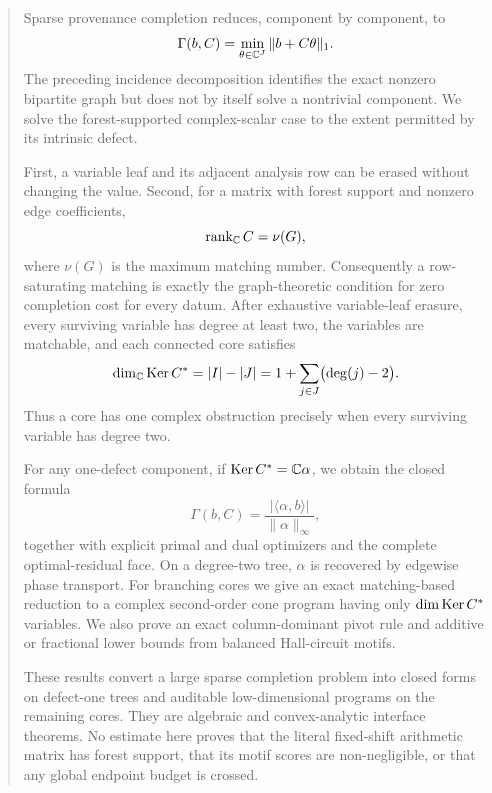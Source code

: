 \begin{abstract}
Sparse provenance completion reduces, component by component, to
\[
  \Gamma(b,C)=\min_{\theta\in\C^J}\|b+C\theta\|_1.
\]
The preceding incidence decomposition identifies the exact nonzero
bipartite graph but does not by itself solve a nontrivial component.  We
solve the forest-supported complex-scalar case to the extent permitted
by its intrinsic defect.

First, a variable leaf and its adjacent analysis row can be erased
without changing the value.  Second, for a matrix with forest support
and nonzero edge coefficients,
\[
  \rank_{\C} C=\nu(G),
\]
where \(\nu(G)\) is the maximum matching number.  Consequently a
row-saturating matching is exactly the graph-theoretic condition for
zero completion cost for every datum.  After exhaustive variable-leaf
erasure, every surviving variable has degree at least two, the variables
are matchable, and each connected core satisfies
\[
 \dim_{\C}\Ker C^*
 =|I|-|J|
 =1+\sum_{j\in J}\bigl(\deg(j)-2\bigr).
\]
Thus a core has one complex obstruction precisely when every surviving
variable has degree two.

For any one-defect component, if \(\Ker C^*=\C\alpha\), we obtain the
closed formula
\[
 \Gamma(b,C)=
 \frac{|\langle\alpha,b\rangle|}{\|\alpha\|_\infty},
\]
together with explicit primal and dual optimizers and the complete
optimal-residual face.  On a degree-two tree, \(\alpha\) is recovered by
edgewise phase transport.  For branching cores we give an exact
matching-based reduction to a complex second-order cone program having
only \(\dim\Ker C^*\) variables.  We also prove an exact
column-dominant pivot rule and additive or fractional lower bounds from
balanced Hall-circuit motifs.

These results convert a large sparse completion problem into closed
forms on defect-one trees and auditable low-dimensional programs on the
remaining cores.  They are algebraic and convex-analytic interface
theorems.  No estimate here proves that the literal fixed-shift
arithmetic matrix has forest support, that its motif scores are
non-negligible, or that any global endpoint budget is crossed.
\end{abstract}

